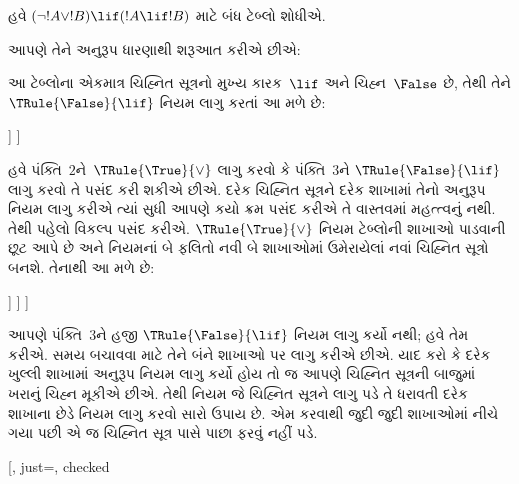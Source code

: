 \begin{ex}
હવે $(\lnot !A \lor !B) \lif (!A \lif !B)$ માટે બંધ ટેબ્લો
શોધીએ.

આપણે તેને અનુરૂપ ધારણાથી શરૂઆત કરીએ છીએ:
\begin{oltableau}
  [\sFmla{\False}{(\lnot \formula{A} \lor \formula{B}) \lif
      (\formula{A} \lif \formula{B})}, just=\TAss]
\end{oltableau}
આ ટેબ્લોના એકમાત્ર ચિહ્નિત સૂત્રનો મુખ્ય કારક~$\lif$
અને ચિહ્ન~$\False$ છે, તેથી તેને $\TRule{\False}{\lif}$ નિયમ લાગુ કરતાં
આ મળે છે:
\begin{oltableau}
  [\sFmla{\False}{(\lnot \formula{A} \lor \formula{B})
      \lif (\formula{A} \lif \formula{B})}, just=\TAss, checked
    [\sFmla{\True}{\lnot \formula{A} \lor \formula{B}},
      just={\TRule{\False}{\lif}[1]}
      [\sFmla{\False}{(\formula{A} \lif \formula{B})},
        just={\TRule{\False}{\lif}[1]}
      ]
    ]
  ]
\end{oltableau}
હવે પંક્તિ~$2$ને~$\TRule{\True}{\lor}$ લાગુ કરવો કે પંક્તિ~$3$ને
$\TRule{\False}{\lif}$ લાગુ કરવો તે પસંદ કરી શકીએ છીએ. દરેક
ચિહ્નિત સૂત્રને દરેક શાખામાં તેનો અનુરૂપ નિયમ લાગુ કરીએ ત્યાં સુધી
આપણે કયો ક્રમ પસંદ કરીએ તે વાસ્તવમાં મહત્ત્વનું નથી. તેથી પહેલો વિકલ્પ
પસંદ કરીએ. $\TRule{\True}{\lor}$ નિયમ ટેબ્લોની શાખાઓ પાડવાની છૂટ
આપે છે અને નિયમનાં બે ફલિતો નવી બે શાખાઓમાં ઉમેરાયેલાં નવાં
ચિહ્નિત સૂત્રો બનશે. તેનાથી આ મળે છે:
\begin{oltableau}
  [\sFmla{\False}{(\lnot \formula{A} \lor \formula{B}) \lif
      (\formula{A} \lif \formula{B})}, just=\TAss, checked
    [\sFmla{\True}{\lnot \formula{A} \lor \formula{B}},
      just={\TRule{\False}{\lif}[1]}, checked
      [\sFmla{\False}{(\formula{A} \lif \formula{B})},
        just={\TRule{\False}{\lif}[1]}
        [\sFmla{\True}{\lnot \formula{A}}, just={\TRule{\True}{\lor}[2]}]
        [\sFmla{\True}{\formula{B}}, just={\TRule{\True}{\lor}[2]}]
      ]
    ]
  ]
\end{oltableau}
આપણે પંક્તિ~$3$ને હજી $\TRule{\False}{\lif}$ નિયમ લાગુ કર્યો નથી; હવે
તેમ કરીએ. સમય બચાવવા માટે તેને બંને શાખાઓ પર લાગુ કરીએ છીએ. યાદ કરો કે
દરેક ખુલ્લી શાખામાં અનુરૂપ નિયમ લાગુ કર્યો હોય તો જ આપણે
ચિહ્નિત સૂત્રની બાજુમાં ખરાનું ચિહ્ન મૂકીએ છીએ. તેથી નિયમ જે
ચિહ્નિત સૂત્રને લાગુ પડે તે ધરાવતી દરેક શાખાના છેડે નિયમ લાગુ કરવો
સારો ઉપાય છે. એમ કરવાથી જુદી જુદી શાખાઓમાં નીચે ગયા પછી એ જ
ચિહ્નિત સૂત્ર પાસે પાછા ફરવું નહીં પડે.
\begin{oltableau}
  [, just=\TAss, checked

\end{oltableau}
\end{ex}
